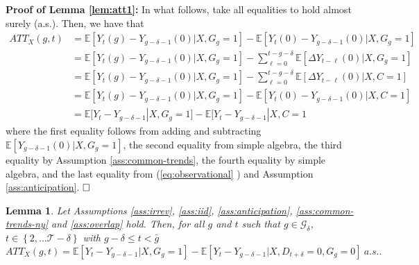 \documentclass[11pt]{article}%
\theoremstyle{plain}
\newtheorem{lemma}{Lemma}
\numberwithin{sassumption}{section}
\numberwithin{equation}{section}
\begin{document}
{\small \noindent\textbf{Proof of Lemma \ref{lem:att1}:} In what follows, take
all equalities to hold almost surely (a.s.). Then, we have that%
\begin{align*}
ATT_{X}(g,t)  &  =\mathbb{E}[Y_{t}\left(  g\right)  -Y_{g-\delta-1}\left(
0\right)  |X,G_{g}=1]-\mathbb{E}[Y_{t}\left(  0\right)  -Y_{g-\delta-1}\left(
0\right)  |X,G_{g}=1]\\
&  =\mathbb{E}[Y_{t}\left(  g\right)  -Y_{g-\delta-1}\left(  0\right)
|X,G_{g}=1]-\sum_{\ell=0}^{t-g-\delta}\mathbb{E}[\Delta Y_{t-\ell}\left(
0\right)  |X,G_{g}=1]\\
&  =\mathbb{E}[Y_{t}\left(  g\right)  -Y_{g-\delta-1}\left(  0\right)
|X,G_{g}=1]-\sum_{\ell=0}^{t-g-\delta}\mathbb{E}[\Delta Y_{t-\ell}\left(
0\right)  |X,C=1]\\
&  =\mathbb{E}[Y_{t}\left(  g\right)  -Y_{g-\delta-1}\left(  0\right)
|X,G_{g}=1]-\mathbb{E}[Y_{t}\left(  0\right)  -Y_{g-\delta-1}\left(  0\right)
|X,C=1]\\
&  =\mathbb{E}[Y_{t}-Y_{g-\delta-1}|X,G_{g}=1]-\mathbb{E}[Y_{t}-Y_{g-\delta
-1}|X,C=1
\end{align*}
where the first equality follows from adding and subtracting $\mathbb{E}%
[Y_{g-\delta-1}\left(  0\right)  |X,G_{g}=1]$, the second equality from simple
algebra, the third equality by Assumption \ref{ass:common-trends}, the fourth
equality by simple algebra, and the last equality from (\ref{eq:observational}%
) and Assumption \ref{ass:anticipation}. $\square\bigskip$ }

\begin{lemma}
{\small \label{lem:att1-ny} Let Assumptions \ref{ass:irrev}, \ref{ass:iid},
\ref{ass:anticipation}, \ref{ass:common-trends-ny} and \ref{ass:overlap} hold.
Then, for all $g$ and $t$ such that $g\in\mathcal{G}_{\delta}$, $t\in\left\{
2,\dots\mathcal{T-\delta}\right\}  $ with $g-\delta \le t < \bar{g}$
\[
ATT_{X}(g,t)=\mathbb{E}[Y_{t}-Y_{g-\delta-1}|X,G_{g}=1]-\mathbb{E}%
[Y_{t}-Y_{g-\delta-1}|X,D_{t+\delta}=0,G_{g}=0]\ a.s..
\]
}
\end{lemma}
\end{document}
